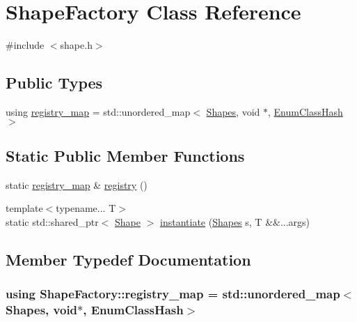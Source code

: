 \hypertarget{class_shape_factory}{\section{Shape\-Factory Class Reference}
\label{class_shape_factory}
}


{\ttfamily \#include $<$shape.\-h$>$}

\subsection*{Public Types}
\begin{DoxyCompactItemize}
\item 
using \hyperlink{class_shape_factory_a4d45cc55a23b2863725a96e922c1b6e5}{registry\-\_\-map} = std\-::unordered\-\_\-map$<$ \hyperlink{shape_8h_a3c6c49dd4d974c67346f991bc443b14b}{Shapes}, void $\ast$, \hyperlink{struct_enum_class_hash}{Enum\-Class\-Hash} $>$
\end{DoxyCompactItemize}
\subsection*{Static Public Member Functions}
\begin{DoxyCompactItemize}
\item 
static \hyperlink{class_shape_factory_a4d45cc55a23b2863725a96e922c1b6e5}{registry\-\_\-map} \& \hyperlink{class_shape_factory_a9f7601b28898cb767d3c1932b88dd3e8}{registry} ()
\item 
{\footnotesize template$<$typename... T$>$ }\\static std\-::shared\-\_\-ptr$<$ \hyperlink{class_shape}{Shape} $>$ \hyperlink{class_shape_factory_af208930b3b6cd6705bb2f4347384f928}{instantiate} (\hyperlink{shape_8h_a3c6c49dd4d974c67346f991bc443b14b}{Shapes} s, T \&\&...args)
\end{DoxyCompactItemize}


\subsection{Member Typedef Documentation}
\hypertarget{class_shape_factory_a4d45cc55a23b2863725a96e922c1b6e5}{
\subsubsection[{registry\-\_\-map}]{\setlength{\rightskip}{0pt plus 5cm}using {\bf Shape\-Factory\-::registry\-\_\-map} =  std\-::unordered\-\_\-map$<${\bf Shapes}, void$\ast$, {\bf Enum\-Class\-Hash}$>$}}\label{class_shape_factory_a4d45cc55a23b2863725a96e922c1b6e5}


